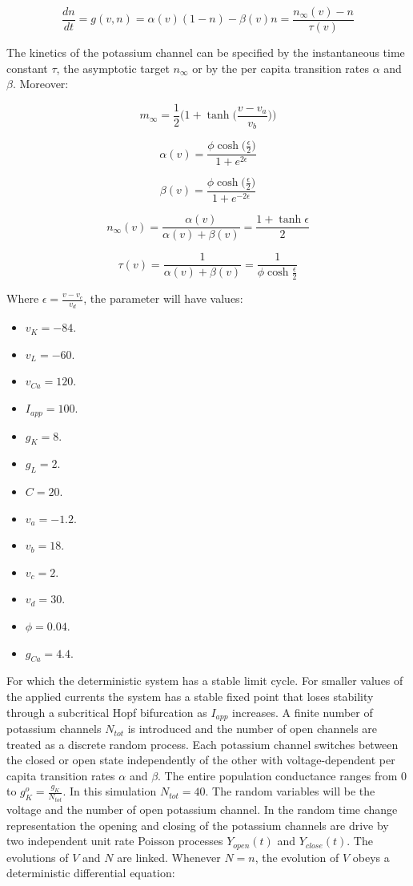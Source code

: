 $$\frac{dn}{dt} = g(v, n) = \alpha(v)(1-n)-\beta(v)n = \frac{n_{\infty}(v)-n}{\tau(v)}$$

The kinetics of the potassium channel can be specified by the instantaneous time constant $\tau$, the asymptotic target $n_{\infty}$ or by the per capita transition rates $\alpha$ and $\beta$.
Moreover:

$$m_{\infty} = \frac{1}{2}\biggl(1+\tanh\biggl(\frac{v-v_a}{v_b}\biggr)\biggr)$$

$$\alpha(v) = \frac{\phi\cosh\bigl(\frac{\epsilon}{2}\bigr)}{1+e^{2\epsilon}}$$

$$\beta(v) = \frac{\phi\cosh\bigl(\frac{\epsilon}{2}\bigr)}{1+e^{-2\epsilon}}$$

$$n_\infty(v) = \frac{\alpha(v)}{\alpha(v)+\beta(v)} = \frac{1+\tanh\epsilon}{2}$$

$$\tau(v) = \frac{1}{\alpha(v)+\beta(v)} = \frac{1}{\phi\cosh\frac{\epsilon}{2}}$$

Where $\epsilon = \frac{v-v_c}{v_d}$, the parameter will have values:

\begin{multicols}{3}
	\begin{itemize}
		\item $v_K = -84$.
		\item $v_L = -60$.
		\item $v_{Ca} = 120$.
		\item $I_{app} = 100$.
		\item $g_K = 8$.
		\item $g_L = 2$.
		\item $C = 20$.
		\item $v_a = -1.2$.
		\item $v_b = 18$.
		\item $v_c = 2$.
		\item $v_d = 30$.
		\item $\phi = 0.04$.
		\item $g_{Ca} = 4.4$.
	\end{itemize}
\end{multicols}

For which the deterministic system has a stable limit cycle.
For smaller values of the applied currents the system has a stable fixed point that loses stability through a subcritical Hopf bifurcation as $I_{app}$ increases.
A finite number of potassium channels $N_{tot}$ is introduced and the number of open channels are treated as a discrete random process.
Each potassium channel switches between the closed or open state independently of the other with voltage-dependent per capita transition rates $\alpha$ and $\beta$.
The entire population conductance ranges from $0$ to $g_K^o = \frac{g_K}{N_{tot}}$.
In this simulation $N_{tot} = 40$.
The random variables will be the voltage and the number of open potassium channel.
In the random time change representation the opening and closing of the potassium channels are drive by two independent unit rate Poisson processes $Y_{open}(t)$ and $Y_{close}(t)$.
The evolutions  of $V$ and $N$ are linked.
Whenever $N=n$, the evolution of $V$ obeys a deterministic differential equation:

